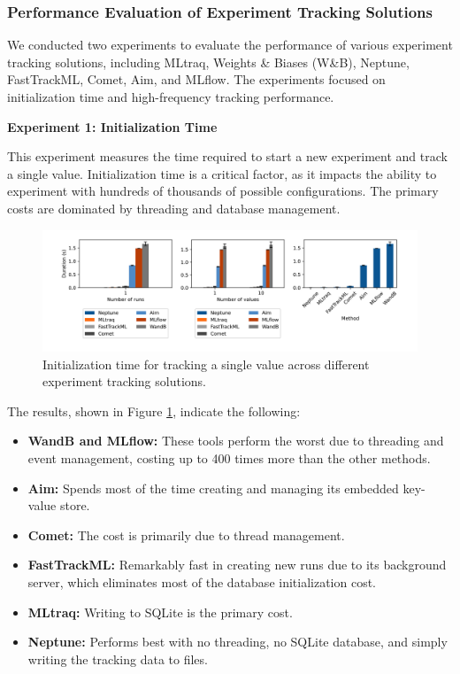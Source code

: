 \subsubsection{Performance Evaluation of Experiment Tracking Solutions}

We conducted two experiments to evaluate the performance of various experiment tracking solutions, including MLtraq, Weights \& Biases (W\&B), Neptune, FastTrackML, Comet, Aim, and MLflow. The experiments focused on initialization time and high-frequency tracking performance.

\textbf{Experiment 1: Initialization Time}

This experiment measures the time required to start a new experiment and track a single value. Initialization time is a critical factor, as it impacts the ability to experiment with hundreds of thousands of possible configurations. The primary costs are dominated by threading and database management.

\begin{figure}[h!]
    \centering
    \includegraphics[width=\textwidth]{images/mltraq/mltraq-Initialization-time.png}
    \caption{Initialization time for tracking a single value across different experiment tracking solutions.}
    \label{fig:init-time}
\end{figure}

The results, shown in Figure \ref{fig:init-time}, indicate the following:

\begin{itemize}
    \item \textbf{WandB and MLflow:} These tools perform the worst due to threading and event management, costing up to 400 times more than the other methods.
    \item \textbf{Aim:} Spends most of the time creating and managing its embedded key-value store.
    \item \textbf{Comet:} The cost is primarily due to thread management.
    \item \textbf{FastTrackML:} Remarkably fast in creating new runs due to its background server, which eliminates most of the database initialization cost.
    \item \textbf{MLtraq:} Writing to SQLite is the primary cost.
    \item \textbf{Neptune:} Performs best with no threading, no SQLite database, and simply writing the tracking data to files.
\end{itemize}


